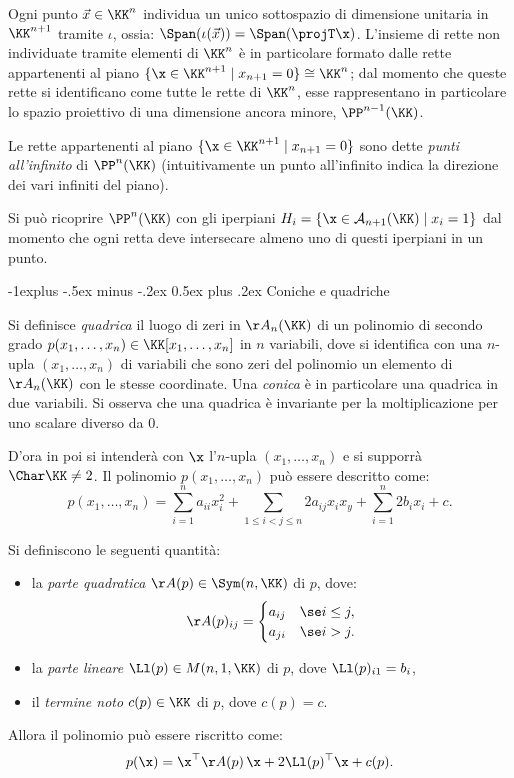 \documentclass[10pt,landscape]{article}
\makeatletter
\renewcommand{\subsection}{\@startsection{subsection}{2}{0mm}%
	{-1explus -.5ex minus -.2ex}%
	{0.5ex plus .2ex}%
	{\normalfont\normalsize\bfseries}}
\makeatother
\begin{document}
\begin{multicols}{3}
        Ogni punto $\vec x \in \KK^n$ individua un unico sottospazio di dimensione unitaria in $\KK^{n+1}$ tramite $\iota$, ossia: $\Span(\iota(\vec x)) = \Span(\projT\x)$. L'insieme di rette non individuate tramite elementi di $\KK^n$ è in particolare formato dalle rette appartenenti al piano $\{\x \in \KK^{n+1} \mid x_{n+1}=0\}\cong \KK^n$; dal momento che queste rette si identificano come tutte le rette di $\KK^n$, esse rappresentano in particolare lo spazio proiettivo di una dimensione ancora minore, $\PP^{n-1}(\KK)$.

        Le rette appartenenti al piano $\{\x \in \KK^{n+1} \mid x_{n+1}=0\}$ sono dette \textit{punti all'infinito} di $\PP^n(\KK)$ (intuitivamente un punto all'infinito indica la direzione dei vari infiniti del piano).

        Si può ricoprire $\PP^n(\KK)$ con gli iperpiani $H_i=\{\x\in \mathcal{A}_{n+1}(\KK)\mid x_{i}=1\}$ dal momento che ogni retta deve intersecare almeno uno di questi iperpiani in un punto.
		
		\subsection{Coniche e quadriche}
		
		\setlength{\extrarowheight}{4pt}
	
		Si definisce \textit{quadrica} il luogo di zeri in $\AA_n(\KK)$ di un polinomio
		di secondo grado $p(x_1, \ldots, x_n) \in \KK[x_1, \ldots, x_n]$ in $n$ variabili, dove si identifica con
		una $n$-upla $(x_1, \ldots, x_n)$ di variabili che sono zeri del polinomio
		un elemento di $\AA_n(\KK)$ con le stesse coordinate.
        Una \textit{conica} è in particolare una quadrica in due variabili. Si osserva che
        una quadrica è invariante per la moltiplicazione per uno scalare diverso
        da $0$.

        D'ora in poi si intenderà con $\x$ l'$n$-upla $(x_1, \ldots, x_n)$ e si supporrà
        $\Char \KK \neq 2$. Il polinomio $p(x_1, \ldots, x_n)$ può essere descritto come:
        \[ p(x_1, \ldots, x_n) = \sum_{i=1}^n a_{ii} x_i^2 + \sum_{1 \leq i<j\leq n} 2 a_{ij} x_i x_y + \sum_{i=1}^n 2 b_i x_i + c. \]
        
        Si definiscono le seguenti quantità:
        
        \begin{itemize}
        	\item la \textit{parte quadratica} $\AA(p) \in \Sym(n, \KK)$ di $p$, dove:
        	\[ \AA(p)_{ij} = \begin{cases}
        		a_{ij} & \se i \leq j, \\
        		a_{ji} & \se i > j.
        	\end{cases} \]
        	\item la \textit{parte lineare} $\Ll(p) \in M(n, 1, \KK)$ di $p$, dove $\Ll(p)_{i1} = b_i$,
        	\item il \textit{termine noto} $c(p) \in \KK$ di $p$, dove $c(p) = c$.
        \end{itemize}
        Allora il polinomio può essere riscritto come:
        \[ p(\x) = \x^\top \AA(p) \, \x + 2 \Ll(p)^\top \x + c(p). \]


\end{multicols}
\end{document}
